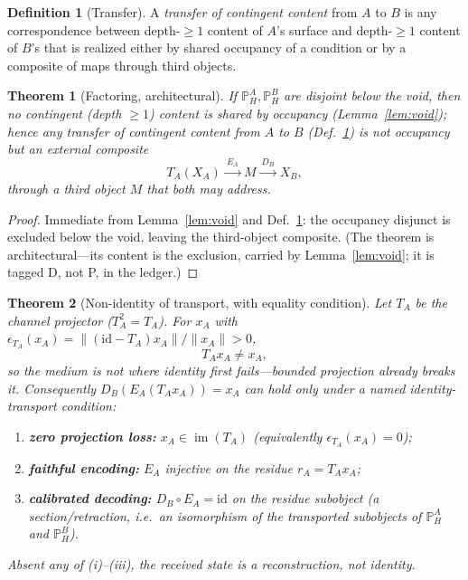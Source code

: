 \documentclass[11pt]{article}
\newtheorem{theorem}{Theorem}
\theoremstyle{definition}
\newtheorem{definition}{Definition}
\theoremstyle{remark}
\newcommand{\PH}{\mathbb{P}_{H}}
\begin{document}
\begin{definition}[Transfer]\label{def:transfer}
A \emph{transfer of contingent content} from $A$ to $B$ is any correspondence between depth-$\ge1$
content of $A$'s surface and depth-$\ge1$ content of $B$'s that is realized either by shared
occupancy of a condition or by a composite of maps through third objects.
\end{definition}

\begin{theorem}[Factoring, architectural]\label{thm:factor}
If $\PH^A,\PH^B$ are disjoint below the void, then no contingent (depth $\ge 1$) content is shared by
occupancy (Lemma~\ref{lem:void}); hence any transfer of contingent content from $A$ to $B$
(Def.~\ref{def:transfer}) is not occupancy but an external composite
\[
  T_A(X_A) \xrightarrow{\ E_A\ } M \xrightarrow{\ D_B\ } X_B ,
\]
through a third object $M$ that both may address.
\end{theorem}

\begin{proof}
Immediate from Lemma~\ref{lem:void} and Def.~\ref{def:transfer}: the occupancy disjunct is excluded
below the void, leaving the third-object composite. (The theorem is architectural---its content is
the exclusion, carried by Lemma~\ref{lem:void}; it is tagged D, not P, in the ledger.)
\end{proof}

\begin{theorem}[Non-identity of transport, with equality condition]\label{thm:nonid}
Let $T_A$ be the channel projector ($T_A^2=T_A$). For $x_A$ with
$\epsilon_{T_A}(x_A)=\|(\mathrm{id}-T_A)x_A\|/\|x_A\|>0$,
\[
  T_Ax_A\neq x_A,
\]
so the medium is \emph{not} where identity first fails---bounded projection already breaks it.
Consequently $D_B(E_A(T_Ax_A))=x_A$ can hold only under a \emph{named identity-transport condition}:
\begin{enumerate}[leftmargin=1.8em,label=(\roman*)]
\item \textbf{zero projection loss:} $x_A\in\operatorname{im}(T_A)$ (equivalently $\epsilon_{T_A}(x_A)=0$);
\item \textbf{faithful encoding:} $E_A$ injective on the residue $r_A=T_Ax_A$;
\item \textbf{calibrated decoding:} $D_B\circ E_A=\mathrm{id}$ on the residue subobject (a
  section/retraction, i.e.\ an isomorphism of the transported subobjects of $\PH^A$ and $\PH^B$).
\end{enumerate}
Absent any of (i)--(iii), the received state is a reconstruction, not identity.
\end{theorem}
\end{document}
